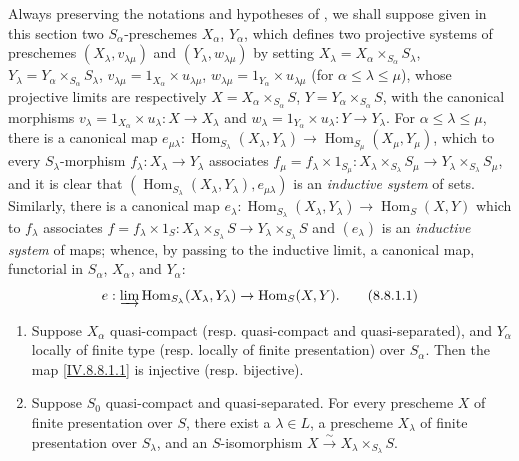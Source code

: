 \begin{env}[8.8.1]
\label{IV.8.8.1}
Always preserving the notations and hypotheses of , we shall suppose given in this section two $S_\alpha$-preschemes $X_\alpha$, $Y_\alpha$, which defines  two projective systems of preschemes $(X_\lambda,v_{\lambda\mu})$ and $(Y_\lambda,w_{\lambda\mu})$ by setting $X_\lambda=X_\alpha\times_{S_\alpha}S_\lambda$, $Y_\lambda=Y_\alpha\times_{S_\alpha}S_\lambda$, $v_{\lambda\mu}=1_{X_\alpha}\times u_{\lambda\mu}$, $w_{\lambda\mu}=1_{Y_\alpha}\times u_{\lambda\mu}$ (for $\alpha\leqslant\lambda\leqslant\mu$), whose projective limits are respectively $X=X_\alpha\times_{S_\alpha}S$, $Y=Y_\alpha\times_{S_\alpha}S$, with the canonical morphisms $v_\lambda=1_{X_\alpha}\times u_\lambda:X\to X_\lambda$ and $w_\lambda=1_{Y_\alpha}\times u_\lambda:Y\to Y_\lambda$.
For $\alpha\leqslant\lambda\leqslant\mu$, there is a canonical map $e_{\mu\lambda}:\operatorname{Hom}_{S_\lambda}(X_\lambda,Y_\lambda)\to\operatorname{Hom}_{S_\mu}(X_\mu,Y_\mu)$, which to every $S_\lambda$-morphism $f_\lambda:X_\lambda\to Y_\lambda$ associates $f_\mu=f_\lambda\times 1_{S_\mu}:X_\lambda\times_{S_\lambda}S_\mu\to Y_\lambda\times_{S_\lambda}S_\mu$, and it is clear that $(\operatorname{Hom}_{S_\lambda}(X_\lambda,Y_\lambda),e_{\mu\lambda})$ is an \emph{inductive system} of sets.
Similarly, there is a canonical map $e_\lambda:\operatorname{Hom}_{S_\lambda}(X_\lambda,Y_\lambda)\to\operatorname{Hom}_S(X,Y)$ which to $f_\lambda$ associates $f=f_\lambda\times 1_S:X_\lambda\times_{S_\lambda}S\to Y_\lambda\times_{S_\lambda}S$ and $(e_\lambda)$ is an \emph{inductive system} of maps; whence, by passing to the inductive limit, a canonical map, functorial in $S_\alpha$, $X_\alpha$, and $Y_\alpha$:
\[
  e:\varinjlim\operatorname{Hom}_{S_\lambda}(X_\lambda,Y_\lambda)\to\operatorname{Hom}_S(X,Y).
  \tag{8.8.1.1}\label{IV.8.8.1.1}
\]
\end{env}

\begin{theorem}[8.8.2]
\label{IV.8.8.2}
\begin{enumerate}[label=\textup{(\roman*)}]
\item Suppose $X_\alpha$ quasi-compact \textup{(resp.} quasi-compact and quasi-separated\textup{)}, and $Y_\alpha$ locally of finite type \textup{(resp.} locally of finite presentation\textup{)} over $S_\alpha$.
Then the map \eqref{IV.8.8.1.1} is injective \textup{(resp.} bijective\textup{)}.
\item Suppose $S_0$ quasi-compact and quasi-separated.
For every prescheme $X$ of finite presentation over $S$, there exist a $\lambda\in L$, a prescheme $X_\lambda$ of finite presentation over $S_\lambda$, and an $S$-isomorphism $X\xrightarrow{\sim}X_\lambda\times_{S_\lambda}S$.
\end{enumerate}
\end{theorem}

